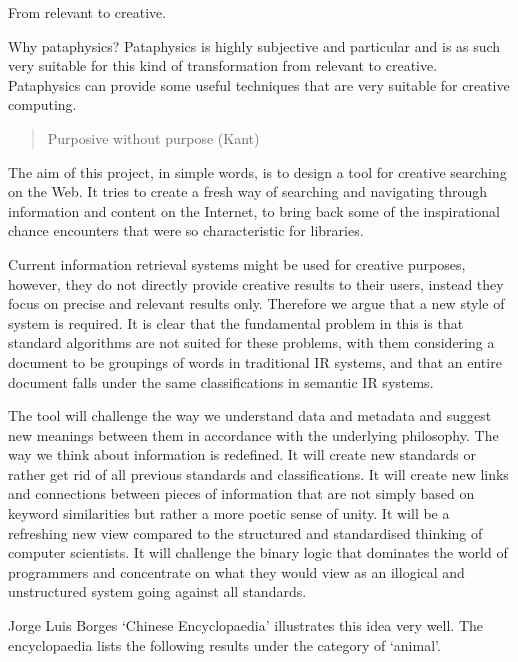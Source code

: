From relevant to creative.

Why pataphysics?
Pataphysics is highly subjective and particular and is as such very suitable for this kind of transformation from relevant to creative.
Pataphysics can provide some useful techniques that are very suitable for creative computing.

\begin{quote}
  Purposive without purpose (Kant)
\end{quote}

The aim of this project, in simple words, is to design a tool for creative searching on the Web. It tries to create a fresh way of searching and navigating through information and content on the Internet, to bring back some of the inspirational chance encounters that were so characteristic for libraries.

Current information retrieval systems might be used for creative purposes, however, they do not directly provide creative results to their users, instead they focus on precise and relevant results only. Therefore we argue that a new style of system is required. It is clear that the fundamental problem in this is that standard algorithms are not suited for these problems, with them considering a document to be groupings of words in traditional IR systems, and that an entire document falls under the same classifications in semantic IR systems.

The tool will challenge the way we understand data and metadata and suggest new meanings between them in accordance with the underlying philosophy. The way we think about information is redefined. It will create new standards or rather get rid of all previous standards and classifications. It will create new links and connections between pieces of information that are not simply based on keyword similarities but rather a more poetic sense of unity. It will be a refreshing new view compared to the structured and standardised thinking of computer scientists. It will challenge the binary logic that dominates the world of programmers and concentrate on what they would view as an illogical and unstructured system going against all standards.

Jorge Luis Borges `Chinese Encyclopaedia' \autocite{Borges2000} illustrates this idea very well. The encyclopaedia lists the following results under the category of `animal'.


